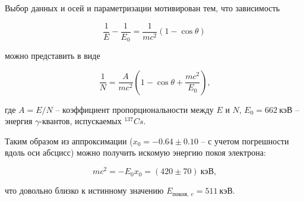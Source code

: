 \documentclass[14pt, a4paper]{report}
\begin{document}
\begin{enumerate}
Выбор данных и осей и параметризации мотивирован тем, что зависимость

\[\frac{1}{E}-\frac{1}{E_0}=\frac{1}{mc^2}(1-\cos{\theta})\]

можно представить в виде

\[\frac{1}{N}=\frac{A}{mc^2}(1-\cos{\theta}+\frac{mc^2}{E_0})\text{,}\]

где $A=E/N$ -- коэффициент пропорциональности между $E$ и $N$, $E_0=662\ кэВ$ -- энергия $\gamma$-квантов, испускаемых $^{137}Cs$.

Таким образом из аппроксимации ($x_0=-0.64\pm0.10$ -- с учетом погрешности вдоль оси абсцисс) можно получить искомую энергию покоя электрона:

\[mc^2=-E_0 x_0=(420\pm70)\ кэВ\text{,}\]

что довольно близко к истинному значению $E_{покоя,\ e}=511\ кэВ$.

\end{enumerate}
\end{document}
